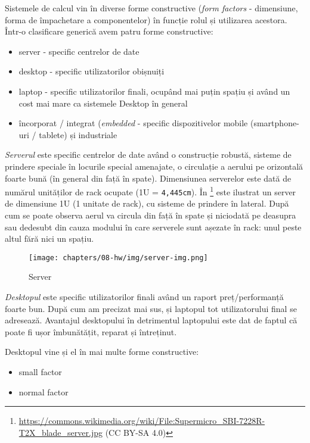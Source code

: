 Sistemele de calcul vin în diverse forme constructive (\textit{form factors} - dimensiune, forma de împachetare a componentelor) în funcție rolul și utilizarea acestora.
Într-o clasificare generică avem patru forme constructive:

\begin{itemize}
  \item server - specific centrelor de date
  \item desktop - specific utilizatorilor obișnuiți
  \item laptop - specific utilizatorilor finali, ocupând mai puțin spațiu și având un cost mai mare ca sistemele Desktop în general
  \item încorporat / integrat (\textit{embedded} - specific dispozitivelor mobile (smartphone-uri / tablete) și industriale
\end{itemize}

\textit{Serverul} este specific centrelor de date având o construcție robustă, sisteme de prindere speciale în locurile special amenajate, o circulație a aerului pe orizontală foarte bună (în general din față în spate).
Dimensiunea serverelor este dată de numărul unităților de rack ocupate (1U = \texttt{4,445cm}).
În \footnote{\url{https://commons.wikimedia.org/wiki/File:Supermicro_SBI-7228R-T2X_blade_server.jpg} (CC BY-SA 4.0)} este ilustrat un server de dimensiune 1U (1 unitate de rack), cu sisteme de prindere în lateral.
După cum se poate observa aerul va circula din față în spate și niciodată pe deasupra sau dedesubt din cauza modului în care serverele sunt așezate în rack: unul peste altul fără nici un spațiu.

\begin{figure}[!htbp]
  \centering
  \texttt{[image: chapters/08-hw/img/server-img.png]}
  \caption{Server}
  \label{fig:hw:server}
\end{figure}

\textit{Desktopul} este specific utilizatorilor finali având un raport preț/performanță foarte bun.
După cum am precizat mai sus, și laptopul tot utilizatorului final se adresează.
Avantajul desktopului în detrimentul laptopului este dat de faptul că poate fi ușor îmbunătățit, reparat și întreținut.

Desktopul vine și el în mai multe forme constructive:

\begin{itemize}
  \item small factor
  \item normal factor
\end{itemize}

